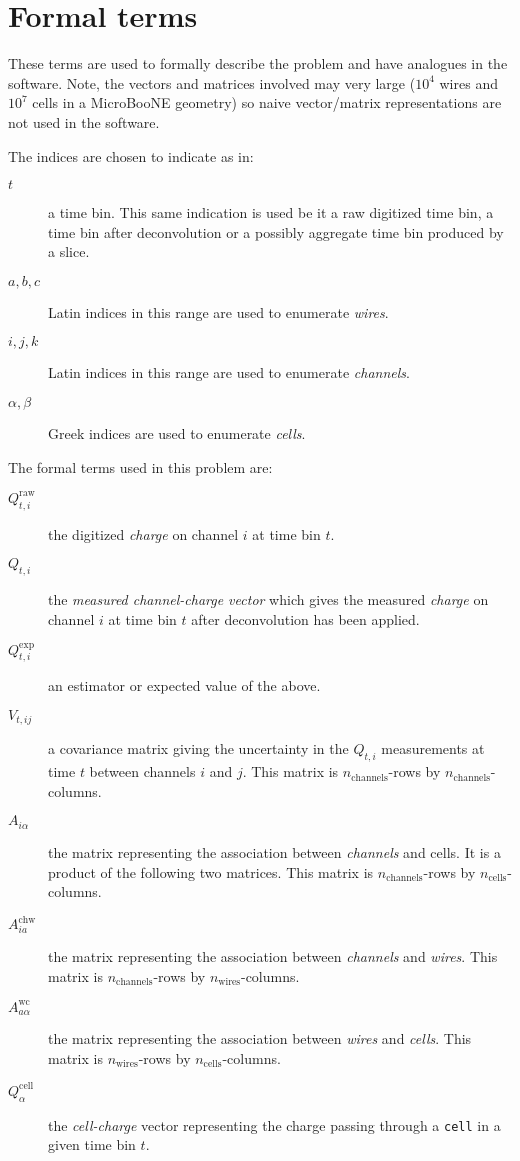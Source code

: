 \documentclass[letter]{article}
\def\mQraw{Q^{\mathrm{raw}}_{t,i}}
\def\Qraw{$\mQraw$\xspace}
\def\mQdec{Q_{t,i}}
\def\Qdec{$\mQdec$\xspace}
\def\mQexp{Q^{\mathrm{exp}}_{t,i}}
\def\Qexp{$\mQexp$\xspace}
\def\mVcov{V_{t,ij}}
\def\Vcov{$\mVcov$\xspace}
\def\mAchc{A_{i\alpha}}
\def\Achc{$\mAchc$\xspace}
\def\mAchw{A^{\mathrm{chw}}_{ia}}
\def\Achw{$\mAchw$\xspace}
\def\mAwc{A^{\mathrm{wc}}_{a\alpha}}
\def\Awc{$\mAwc$\xspace}
\def\mQcell{Q^{\mathrm{cell}}_\alpha}
\def\Qcell{$\mQcell$\xspace}
\begin{document}
\section{Formal terms}

These terms are used to formally describe the problem and have
analogues in the software.
Note, the vectors and matrices involved may very large ($10^4$ wires
and $10^7$ cells in a MicroBooNE geometry) so naive vector/matrix
representations are not used in the software.

\noindent The indices are chosen to indicate as in:
\begin{description}
\item[$t$] a time bin.
  This same indication is used be it a raw digitized time bin, a time
  bin after deconvolution or a possibly aggregate time bin produced by
  a slice.
\item[$a,b,c$] Latin indices in this range are used to enumerate \textit{wires}.
\item[$i,j,k$] Latin indices in this range are used to enumerate \textit{channels}.
\item[$\alpha,\beta$] Greek indices are used to enumerate \textit{cells}.
\end{description}

\noindent The formal terms used in this problem are:
\begin{description}
\item[\Qraw] the digitized \textit{charge} on channel $i$ at
  time bin $t$.
\item[\Qdec] the \textit{measured channel-charge vector} which gives the measured \textit{charge} on channel $i$ at
  time bin $t$ after deconvolution has been applied.
\item[\Qexp] an estimator or expected value of the above.
\item[\Vcov] a covariance matrix giving the 
  uncertainty in the \Qdec measurements at time $t$ between channels
  $i$ and $j$.
  This matrix is $n_\mathrm{channels}$-rows by $n_\mathrm{channels}$-columns.
\item[\Achc] the matrix representing the association between \textit{channels} and {cells}.
  It is a product of the following two matrices.
  This matrix is $n_\mathrm{channels}$-rows by $n_\mathrm{cells}$-columns.
\item[\Achw] the matrix representing the association between
  \textit{channels} and \textit{wires}.
  This matrix is $n_\mathrm{channels}$-rows by $n_\mathrm{wires}$-columns.
\item[\Awc] the matrix representing the association between
  \textit{wires} and \textit{cells}.
  This matrix is $n_\mathrm{wires}$-rows by $n_\mathrm{cells}$-columns.
\item[\Qcell] the \textit{cell-charge} vector representing the charge passing
  through a \texttt{cell} in a given time bin $t$.
\end{description}
\end{document}
